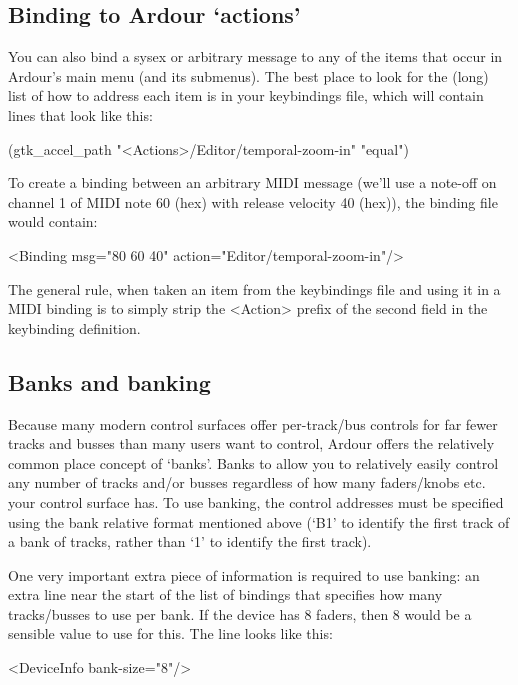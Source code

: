 \documentclass[10pt,a4paper]{book}
\begin{document}
\subsection{Binding to Ardour `actions'}

You can also bind a sysex or arbitrary message to any of the items
that occur in Ardour's main menu (and its submenus). The best place to
look for the (long) list of how to address each item is in your
keybindings file, which will contain lines that look like this:

\begin{listing}
(gtk\_accel\_path "<Actions>/Editor/temporal-zoom-in" "equal")
\end{listing}

To create a binding between an arbitrary MIDI message (we'll use a
note-off on channel 1 of MIDI note 60 (hex) with release velocity 40
(hex)), the binding file would contain:

\begin{listing}
<Binding msg="80 60 40" action="Editor/temporal-zoom-in"/>
\end{listing}

The general rule, when taken an item from the keybindings file and
using it in a MIDI binding is to simply strip the <Action> prefix of
the second field in the keybinding definition.

\subsection{Banks and banking}

Because many modern control surfaces offer per-track/bus controls for
far fewer tracks and busses than many users want to control, Ardour
offers the relatively common place concept of `banks'. Banks to allow
you to relatively easily control any number of tracks and/or busses
regardless of how many faders/knobs etc. your control surface has. To
use banking, the control addresses must be specified using the bank
relative format mentioned above (`B1' to identify the first track of a
bank of tracks, rather than `1' to identify the first track).

One very important extra piece of information is required to use
banking: an extra line near the start of the list of bindings that
specifies how many tracks/busses to use per bank. If the device has 8
faders, then 8 would be a sensible value to use for this. The line
looks like this:

\begin{listing}
<DeviceInfo bank-size="8"/>
\end{listing}
\end{document}
